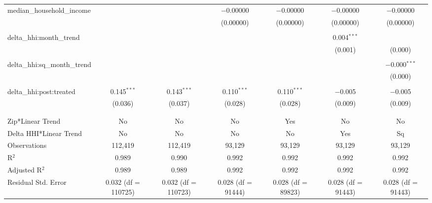 \begin{table}[H]
{\begin{tabular}{@{\extracolsep{5pt}}lcccccc}
  median\_household\_income &  &  & $-$0.00000 & $-$0.00000 & $-$0.00000 & $-$0.00000 \\  

   &  &  & (0.00000) & (0.00000) & (0.00000) & (0.00000) \\  

   & & & & & & \\  

  delta\_hhi:month\_trend &  &  &  &  & 0.004$^{***}$ &  \\  

   &  &  &  &  & (0.001) & (0.000) \\  

   & & & & & & \\  

  delta\_hhi:sq\_month\_trend &  &  &  &  &  & $-$0.000$^{***}$ \\  

   &  &  &  &  &  & (0.000) \\  

   & & & & & & \\  

  delta\_hhi:post:treated & 0.145$^{***}$ & 0.143$^{***}$ & 0.110$^{***}$ & 0.110$^{***}$ & $-$0.005 & $-$0.005 \\  

   & (0.036) & (0.037) & (0.028) & (0.028) & (0.009) & (0.009) \\  

   & & & & & & \\  

 \hline \\[-1.8ex]  

 Zip*Linear Trend & No & No & No & Yes & No & No \\  

 Delta HHI*Linear Trend & No & No & No & No & Yes & Sq \\  

 Observations & 112,419 & 112,419 & 93,129 & 93,129 & 93,129 & 93,129 \\  

 R$^{2}$ & 0.989 & 0.990 & 0.992 & 0.992 & 0.992 & 0.992 \\  

 Adjusted R$^{2}$ & 0.989 & 0.989 & 0.992 & 0.992 & 0.992 & 0.992 \\  

 Residual Std. Error & 0.032 (df = 110725) & 0.032 (df = 110723) & 0.028 (df = 91444) & 0.028 (df = 89823) & 0.028 (df = 91443) & 0.028 (df = 91443) \\  


\end{tabular}}
\end{table}
